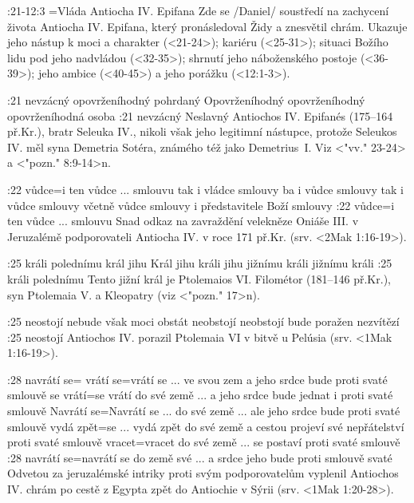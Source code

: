 :21-12:3 {}={Vláda Antiocha IV. Epifana}
        Zde se \x/Daniel/ soustředí na zachycení života Antiocha IV. Epifana, který pronásledoval Židy a znesvětil chrám. Ukazuje jeho nástup k moci a charakter (<21-24>);  kariéru
        (<25-31>); situaci Božího lidu pod jeho nadvládou (<32-35>); shrnutí jeho náboženského postoje  (<36-39>); jeho ambice  (<40-45>) a jeho porážku (<12:1-3>).

:21
    {nevzácný}   %
    {opovrženíhodný}  %
    {pohrdaný}   %
    {Opovrženíhodný}   %
    {opovrženíhodný}   %
    {opovrženíhodná osoba}   %
:21 {nevzácný} 
        Neslavný Antiochos IV. Epifanés (175--164 př.Kr.), bratr Seleuka IV., nikoli však jeho legitimní nástupce, protože Seleukos IV. měl syna Demetria Sotéra, známého též jako Demetrius~I. Viz <"vv." 23-24> a <"pozn." 8:9-14>n.

:22
    {vůdce}={i ten vůdce ...  smlouvu}   %
    {tak i vládce smlouvy}   %
    {ba i vůdce smlouvy}   %
    {tak i vůdce smlouvy}   %
    {včetně vůdce smlouvy}   %
    {i představitele Boží smlouvy}   %
:22 {vůdce}={i ten vůdce ... smlouvu} %
        Snad odkaz na zavraždění velekněze Oniáše III. v Jeruzalémě podporovateli Antiocha IV. v roce 171 př.Kr. (srv. <2Mak 1:16-19>).
        
:25
    {králi polednímu}   %
    {král jihu}   %
    {Král jihu}   %
    {králi jihu}   %
    {jižnímu králi}   %
    {jižnímu králi}   %
:25 {králi polednímu}
    Tento jižní král je Ptolemaios VI. Filométor (181--146 př.Kr.),  syn Ptolemaia V. a Kleopatry (viz <"pozn." 17>n).

:25  
    {neostojí}   %
    {nebude však moci obstát}   %
    {neobstojí}   %
    {neobstojí}   %
    {bude poražen}   %
    {nezvítězí}  %
:25 {neostojí}
    Antiochos IV. porazil Ptolemaia VI v bitvě u Pelúsia (srv. <1Mak 1:16-19>).

:28
    {navrátí se}={}   %
    {vrátí se}={vrátí se ... ve svou zem a jeho srdce bude proti svaté smlouvě}   %
    {se vrátí}={se vrátí do své země ... a jeho srdce bude jednat i proti svaté smlouvě}   %
    {Navrátí se}={Navrátí se ... do své země ... ale jeho srdce bude proti svaté smlouvě}   %
    {vydá zpět}={se ... vydá zpět do své země a cestou projeví své nepřátelství proti svaté smlouvě}   %
    {vracet}={vracet do své země ... se postaví proti svaté smlouvě}   %
:28 {navrátí se}={navrátí se do země své ... a srdce jeho bude proti smlouvě svaté}
    Odvetou za jeruzalémské intriky proti svým podporovatelům vyplenil Antiochos IV. chrám po cestě z Egypta zpět do  Antiochie v Sýrii (srv. <1Mak 1:20-28>). 

